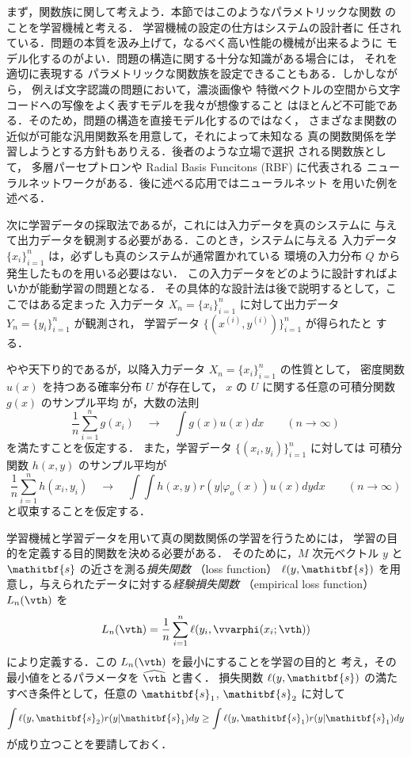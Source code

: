 \documentclass[master]{cimt}
\newcommand{\hvth}{\widehat{{\vth}}}
\newcommand{\vs}{\mathitbf{s}}
\begin{document}
まず，関数族に関して考えよう．本節ではこのようなパラメトリックな関数
のことを学習機械と考える．
学習機械の設定の仕方はシステムの設計者に
任されている．問題の本質を汲み上げて，なるべく高い性能の機械が出来るように
モデル化するのがよい．問題の構造に関する十分な知識がある場合には，
それを適切に表現する
パラメトリックな関数族を設定できることもある．しかしながら，
例えば文字認識の問題において，濃淡画像や
特徴ベクトルの空間から文字コードへの写像をよく表すモデルを我々が想像すること
はほとんど不可能である．そのため，問題の構造を直接モデル化するのではなく，
さまざなま関数の近似が可能な汎用関数系を用意して，それによって未知なる
真の関数関係を学習しようとする方針もありえる．後者のような立場で選択
される関数族として，
多層パーセプトロンや Radial Basis Funcitons (RBF) に代表される
ニューラルネットワークがある．後に述べる応用ではニューラルネット
を用いた例を述べる．

次に学習データの採取法であるが，これには入力データを真のシステムに
与えて出力データを観測する必要がある．このとき，システムに与える
入力データ $\{x_i\}_{i=1}^n$ は，必ずしも真のシステムが通常置かれている
環境の入力分布 $Q$ から発生したものを用いる必要はない．
この入力データをどのように設計すればよいかが能動学習の問題となる．
その具体的な設計法は後で説明するとして，ここではある定まった
入力データ $X_n = \{x_i\}_{i=1}^n$ に対して出力データ 
$Y_n = \{y_i\}_{i=1}^n$ 
が観測され，
学習データ $\{ (x^{(i)}, y^{(i)}) \}_{i=1}^n$ が得られたと
する．

やや天下り的であるが，以降入力データ $X_n = \{x_i\}_{i=1}^n$ の性質として，
密度関数 $u(x)$ を持つある確率分布 $U$ が存在して，
$x$ の $U$ に関する任意の可積分関数 $g(x)$ のサンプル平均
が，大数の法則
\begin{equation}
\label{eq:LLN}
	\frac{1}{n} \sum_{i=1}^n g(x_i) \quad 
	\longrightarrow \quad \int g(x)u(x)dx  \qquad (n \to \infty)
\end{equation}
を満たすことを仮定する．
また，学習データ $\{(x_i,y_i)\}_{i=1}^n$ に対しては
可積分関数 $h(x,y)$ のサンプル平均が
\begin{equation}
\label{eq:LLN2}
	\frac{1}{n} \sum_{i=1}^n h(x_i,y_i) \quad 
	\longrightarrow \quad \int\int h(x,y)r(y|\varphi_o(x))
	u(x)dy dx  
	\qquad (n \to \infty)
\end{equation}
と収束することを仮定する．

学習機械と学習データを用いて真の関数関係の学習を行うためには，
学習の目的を定義する目的関数を決める必要がある．
そのために，$M$ 次元ベクトル $y$ と $\vs$ の近さを測る{\em 損失関数}
（loss function）
 $\ell (y, \vs)$ を用意し，与えられたデータに対する{\em 経験損失関数} 
 （empirical loss function）$L_n(\vth)$ を
\begin{equation}
\label{eq:Ln}
  L_n(\vth) = \frac{1}{n} \sum_{i=1}^n 
  	\ell( y_i, \vvarphi(x_i; \vth) )
\end{equation}
により定義する．この $L_n(\vth)$ を最小にすることを学習の目的と
考え，その最小値をとるパラメータを $\hvth$ と書く．
損失関数 $\ell(y,\vs)$ の満たすべき条件として，任意の $\vs_1$, $\vs_2$ 
に対して
\begin{equation}
\label{eq:loss_assump}
	\int \ell(y, \vs_2) r(y| \vs_1) dy 
	\geq \int \ell(y, \vs_1) r(y | \vs_1) d y
\end{equation}
が成り立つことを要請しておく．
\end{document}
